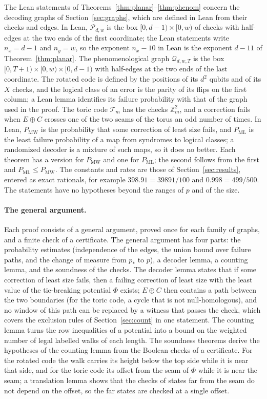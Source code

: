 \documentclass[11pt]{amsart}
\theoremstyle{definition}
\theoremstyle{remark}
\numberwithin{equation}{section}
\newcommand{\PML}{P_{\mathrm{ML}}}
\newcommand{\PMW}{P_{\mathrm{MW}}}
\begin{document}
The Lean statements of Theorems~\ref{thm:planar}--\ref{thm:phenom} concern the decoding graphs of Section~\ref{sec:graphs}, which are defined in Lean from their checks and edges.
In Lean, $\mathcal P_{d,w}$ is the box $[0,d-1)\times[0,w)$ of checks with half-edges at the two ends of the first coordinate; the Lean statements write $n_x=d-1$ and $n_y=w$, so the exponent $n_x-10$ in Lean is the exponent $d-11$ of Theorem~\ref{thm:planar}.
The phenomenological graph $\mathcal Q_{d,w,T}$ is the box $[0,T+1)\times[0,w)\times[0,d-1)$ with half-edges at the two ends of the last coordinate.
The rotated code is defined by the positions of its $d^2$ qubits and of its $X$ checks, and the logical class of an error is the parity of its flips on the first column; a Lean lemma identifies its failure probability with that of the graph used in the proof.
The toric code $\mathcal T_m$ has the checks $\mathbb Z_m^2$, and a correction fails when $E\oplus C$ crosses one of the two seams of the torus an odd number of times.
In Lean, $\PMW$ is the probability that some correction of least size fails, and $\PML$ is the least failure probability of a map from syndromes to logical classes; a randomized decoder is a mixture of such maps, so it does no better.
Each theorem has a version for $\PMW$ and one for $\PML$; the second follows from the first and $\PML\le\PMW$.
The constants and rates are those of Section~\ref{sec:results}, entered as exact rationals, for example $398.91=39891/100$ and $0.998=499/500$.
The statements have no hypotheses beyond the ranges of $p$ and of the size.

\paragraph{The general argument.}
Each proof consists of a general argument, proved once for each family of graphs, and a finite check of a certificate.
The general argument has four parts: the probability estimates (independence of the edges, the union bound over failure paths, and the change of measure from $p_\ast$ to $p$), a decoder lemma, a counting lemma, and the soundness of the checks.
The decoder lemma states that if some correction of least size fails, then a failing correction of least size with the least value of the tie-breaking potential $\Phi$ exists; $E\oplus C$ then contains a path between the two boundaries (for the toric code, a cycle that is not null-homologous), and no window of this path can be replaced by a witness that passes the check, which covers the exclusion rules of Section~\ref{sec:count} in one statement.
The counting lemma turns the row inequalities of a potential into a bound on the weighted number of legal labelled walks of each length.
The soundness theorems derive the hypotheses of the counting lemma from the Boolean checks of a certificate.
For the rotated code the walk carries its height below the top side while it is near that side, and for the toric code its offset from the seam of $\Phi$ while it is near the seam; a translation lemma shows that the checks of states far from the seam do not depend on the offset, so the far states are checked at a single offset.
\end{document}

